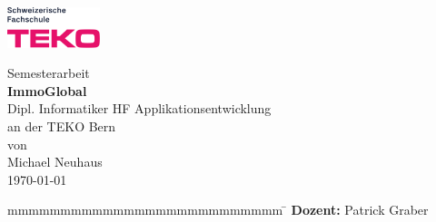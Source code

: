 \newcommand{\arbeit}{Semesterarbeit}
\newcommand{\autor}{Michael Neuhaus}
\newcommand{\gutachter}{Patrick Graber}
\newcommand{\thema}{ImmoGlobal}
\newcommand{\studiengang}{Dipl. Informatiker HF Applikationsentwicklung}
\newcommand{\datumAbgabe}{\today}

\begin{titlepage}
    \includegraphics[width=2.7cm]{content/images/teko.png}
	\enlargethispage{20mm}
	\begin{center}
		\vspace*{12mm}	{\large\normalfont \arbeit}\\
		\vspace*{12mm}	{\large\bfseries \thema }\\
		\vspace*{12mm}	\studiengang\\
		\vspace*{3mm} 	an der TEKO Bern\\
		\vspace*{12mm}	von\\
		\vspace*{3mm} 	{\large\normalfont \autor}\\
		\vspace*{12mm}	\datumAbgabe\\
	\end{center}
	\vspace{2cm}
	\begin{figure}[htp]
		\begin{center}
		\end{center}
	\end{figure}
	\vfill
	\begin{spacing}{1.2}
		\begin{tabbing}
			mmmmmmmmmmmmmmmmmmmmmmmmmm      \= \kill
			\textbf{Dozent:}                 \>  \gutachter
		\end{tabbing}
		\end{spacing}
		\vspace*{20mm}
\end{titlepage}

